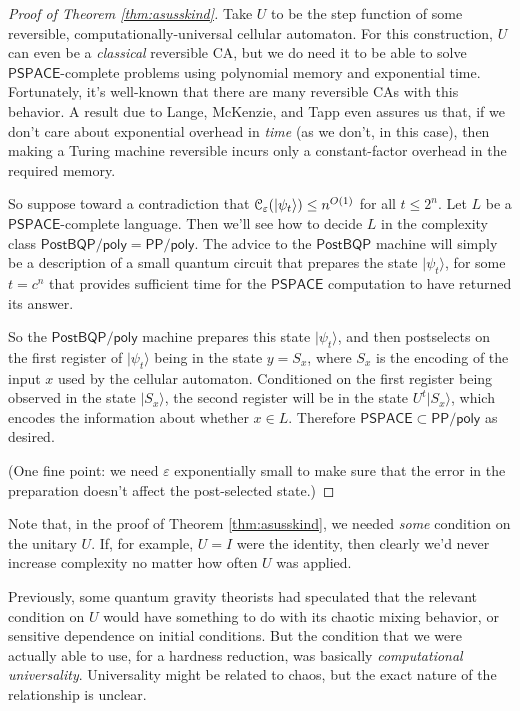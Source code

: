 \documentclass[12pt]{report}
\theoremstyle{plain}
\theoremstyle{definition}
\newcommand{\eps}{\varepsilon}
\renewcommand{\ket}[1]{|#1\rangle}
\begin{document}
\begin{proof}[Proof of Theorem \ref{thm:asusskind}]
Take $U$ to be the step function of some reversible, computationally-universal cellular automaton.  For this construction, $U$ can even be a {\em classical} reversible CA, but we do need it to be able to solve $\mathsf{PSPACE}$-complete problems using polynomial memory and exponential time.  Fortunately, it's well-known that there are many reversible CAs with this behavior.  A result due to Lange, McKenzie, and Tapp \cite{lmt} even assures us that, if we don't care about exponential overhead in {\em time} (as we don't, in this case), then making a Turing machine reversible incurs only a constant-factor overhead in the required memory.

So suppose toward a contradiction that
${\cal C}_\eps(\ket{\psi_t}) \le n^{O(1)}$ for all $t \le 2^n$. Let $L$ be a $\mathsf{PSPACE}$-complete language.  Then we'll see how to decide $L$ in the complexity class $\mathsf{PostBQP/poly} = \mathsf{PP/poly}$.  The advice to the $\mathsf{PostBQP}$ machine will simply be a description of a small quantum circuit that prepares the state $\ket{\psi_t}$, for some $t=c^n$ that provides sufficient time for the $\mathsf{PSPACE}$ computation to have returned its answer.

So the $\mathsf{PostBQP/poly}$ machine prepares this state $\ket{\psi_t}$, and then postselects on the first register of $\ket{\psi_t}$ being in the state $y = S_x$, where $S_x$ is the encoding of the input $x$ used by the cellular automaton.  Conditioned on the first register being observed in the state $\ket{S_x}$, the second register will be in the state $U^t \ket{S_x}$, which encodes the information about whether $x\in L$.  Therefore $\mathsf{PSPACE} \subset \mathsf{PP/poly}$ as desired.

(One fine point: we need $\eps$ exponentially small to make sure that the error in the preparation doesn't affect the post-selected state.)
\end{proof}

Note that, in the proof of Theorem \ref{thm:asusskind}, we needed {\em some} condition on the unitary $U$.  If, for example, $U=I$ were the identity, then clearly we'd never increase complexity no matter how often $U$ was applied.

Previously, some quantum gravity theorists had speculated that the relevant condition on $U$ would have something to do with its chaotic mixing behavior, or sensitive dependence on initial conditions.  But the condition that we were actually able to use, for a hardness reduction, was basically {\em computational universality}.  Universality might be related to chaos, but the exact nature of the relationship is unclear.
\end{document}
